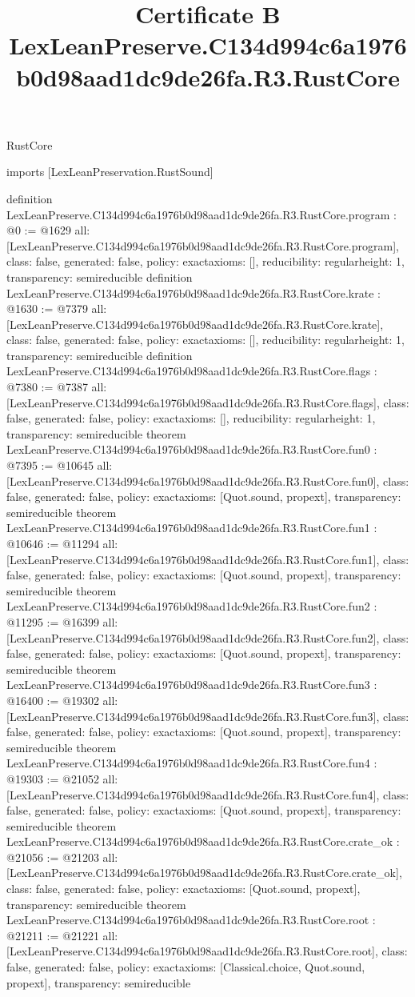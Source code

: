 \begin{lexlean}{RustCore}
\title{Certificate B LexLeanPreserve.C134d994c6a1976b0d98aad1dc9de26fa.R3.RustCore}
\begin{coremodule}
imports [LexLeanPreservation.RustSound]

definition LexLeanPreserve.C134d994c6a1976b0d98aad1dc9de26fa.R3.RustCore.program : @0 := @1629 {
  all: [LexLeanPreserve.C134d994c6a1976b0d98aad1dc9de26fa.R3.RustCore.program],
  class: false,
  generated: false,
  policy: exact{axioms: []},
  reducibility: regular{height: 1},
  transparency: semireducible
}
definition LexLeanPreserve.C134d994c6a1976b0d98aad1dc9de26fa.R3.RustCore.krate : @1630 := @7379 {
  all: [LexLeanPreserve.C134d994c6a1976b0d98aad1dc9de26fa.R3.RustCore.krate],
  class: false,
  generated: false,
  policy: exact{axioms: []},
  reducibility: regular{height: 1},
  transparency: semireducible
}
definition LexLeanPreserve.C134d994c6a1976b0d98aad1dc9de26fa.R3.RustCore.flags : @7380 := @7387 {
  all: [LexLeanPreserve.C134d994c6a1976b0d98aad1dc9de26fa.R3.RustCore.flags],
  class: false,
  generated: false,
  policy: exact{axioms: []},
  reducibility: regular{height: 1},
  transparency: semireducible
}
theorem LexLeanPreserve.C134d994c6a1976b0d98aad1dc9de26fa.R3.RustCore.fun0 : @7395 := @10645 {
  all: [LexLeanPreserve.C134d994c6a1976b0d98aad1dc9de26fa.R3.RustCore.fun0],
  class: false,
  generated: false,
  policy: exact{axioms: [Quot.sound, propext]},
  transparency: semireducible
}
theorem LexLeanPreserve.C134d994c6a1976b0d98aad1dc9de26fa.R3.RustCore.fun1 : @10646 := @11294 {
  all: [LexLeanPreserve.C134d994c6a1976b0d98aad1dc9de26fa.R3.RustCore.fun1],
  class: false,
  generated: false,
  policy: exact{axioms: [Quot.sound, propext]},
  transparency: semireducible
}
theorem LexLeanPreserve.C134d994c6a1976b0d98aad1dc9de26fa.R3.RustCore.fun2 : @11295 := @16399 {
  all: [LexLeanPreserve.C134d994c6a1976b0d98aad1dc9de26fa.R3.RustCore.fun2],
  class: false,
  generated: false,
  policy: exact{axioms: [Quot.sound, propext]},
  transparency: semireducible
}
theorem LexLeanPreserve.C134d994c6a1976b0d98aad1dc9de26fa.R3.RustCore.fun3 : @16400 := @19302 {
  all: [LexLeanPreserve.C134d994c6a1976b0d98aad1dc9de26fa.R3.RustCore.fun3],
  class: false,
  generated: false,
  policy: exact{axioms: [Quot.sound, propext]},
  transparency: semireducible
}
theorem LexLeanPreserve.C134d994c6a1976b0d98aad1dc9de26fa.R3.RustCore.fun4 : @19303 := @21052 {
  all: [LexLeanPreserve.C134d994c6a1976b0d98aad1dc9de26fa.R3.RustCore.fun4],
  class: false,
  generated: false,
  policy: exact{axioms: [Quot.sound, propext]},
  transparency: semireducible
}
theorem LexLeanPreserve.C134d994c6a1976b0d98aad1dc9de26fa.R3.RustCore.crate_ok : @21056 := @21203 {
  all: [LexLeanPreserve.C134d994c6a1976b0d98aad1dc9de26fa.R3.RustCore.crate_ok],
  class: false,
  generated: false,
  policy: exact{axioms: [Quot.sound, propext]},
  transparency: semireducible
}
theorem LexLeanPreserve.C134d994c6a1976b0d98aad1dc9de26fa.R3.RustCore.root : @21211 := @21221 {
  all: [LexLeanPreserve.C134d994c6a1976b0d98aad1dc9de26fa.R3.RustCore.root],
  class: false,
  generated: false,
  policy: exact{axioms: [Classical.choice, Quot.sound, propext]},
  transparency: semireducible
}


\end{coremodule}
\end{lexlean}
